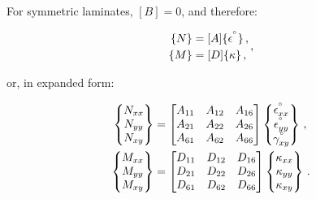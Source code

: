\documentclass[twocolumn, linenumbers, superscriptaddress, nofootinbib]{revtex4-1}
\begin{document}
				For symmetric laminates, $[B] = 0$, and therefore:
				
				\begin{equation}
				\label{eqn::abbd}
					\begin{aligned}
						\{N\} & = [A]\{\epsilon^{\degree}\}\,, \\
						\{M\} & = [D]\{\kappa\}\,,						
					\end{aligned}\,,
				\end{equation}
				
				or, in expanded form:
				
				\begin{equation}
					\begin{aligned}
						\begin{Bmatrix}
							N_{xx} \\
							N_{yy} \\
							N_{xy}
						\end{Bmatrix}
						& =
						\begin{bmatrix}
							A_{11} & A_{12} & A_{16} \\
							A_{21} & A_{22} & A_{26} \\
							A_{61} & A_{62} & A_{66}
						\end{bmatrix}
						\begin{Bmatrix}
							\epsilon^{\degree}_{xx} \\
							\epsilon^{\degree}_{yy} \\
							\gamma^{\degree}_{xy}
						\end{Bmatrix}\,,
						\\
						\begin{Bmatrix}
							M_{xx} \\
							M_{yy} \\
							M_{xy}
						\end{Bmatrix}
						& =
						\begin{bmatrix}
							D_{11} & D_{12} & D_{16} \\
							D_{21} & D_{22} & D_{26} \\
							D_{61} & D_{62} & D_{66}
						\end{bmatrix}
						\begin{Bmatrix}
							\kappa_{xx} \\
							\kappa_{yy} \\
							\kappa_{xy}
						\end{Bmatrix}\,.
					\end{aligned}
				\end{equation}
				
\end{document}

